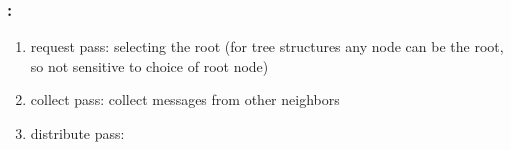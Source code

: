 \begin{frame}\frametitle{\secname: \subsecname}

\begin{enumerate}
\item request pass: selecting the root (for tree structures any node can be the root, so not sensitive to choice of root node)
\item collect pass: collect messages from other neighbors
\item distribute pass: 
\end{enumerate}

\end{frame}

